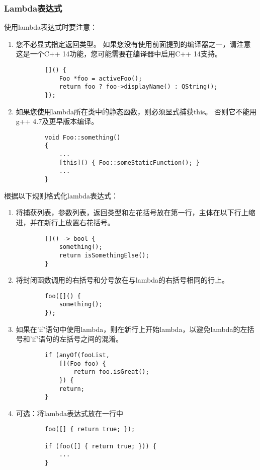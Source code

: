 \subsubsection{Lambda表达式}
使用lambda表达式时要注意：
\begin{enumerate}
	\item 您不必显式指定返回类型。 如果您没有使用前面提到的编译器之一，请注意这是一个C++ 14功能，您可能需要在编译器中启用C++ 14支持。
	\begin{lstlisting}
		[]() {
			Foo *foo = activeFoo();
			return foo ? foo->displayName() : QString();
		});
	\end{lstlisting}
	\item 如果您使用lambda所在类中的静态函数，则必须显式捕获this。 否则它不能用g++ 4.7及更早版本编译。
	\begin{lstlisting}
		void Foo::something()
		{
			...
			[this]() { Foo::someStaticFunction(); }
			...
		}
	\end{lstlisting}
\end{enumerate}
根据以下规则格式化lambda表达式：
\begin{enumerate}
	\item 将捕获列表，参数列表，返回类型和左花括号放在第一行，主体在以下行上缩进，并在新行上放置右花括号。
	\begin{lstlisting}
		[]() -> bool {
			something();
			return isSomethingElse();
		}
	\end{lstlisting}
	
	\item 将封闭函数调用的右括号和分号放在与lambda的右括号相同的行上。
	\begin{lstlisting}
		foo([]() {
			something();
		});
	\end{lstlisting}
	
	\item 如果在'if'语句中使用lambda，则在新行上开始lambda，以避免lambda的左括号和'if'语句的左括号之间的混淆。
	\begin{lstlisting}
        if (anyOf(fooList,
			[](Foo foo) {
				return foo.isGreat();
			}) {
			return;
		}
	\end{lstlisting}
	
	\item 可选：将lambda表达式放在一行中
	\begin{lstlisting}
		foo([] { return true; });
		
		if (foo([] { return true; })) {
			...
		}
	\end{lstlisting}
	
\end{enumerate}
